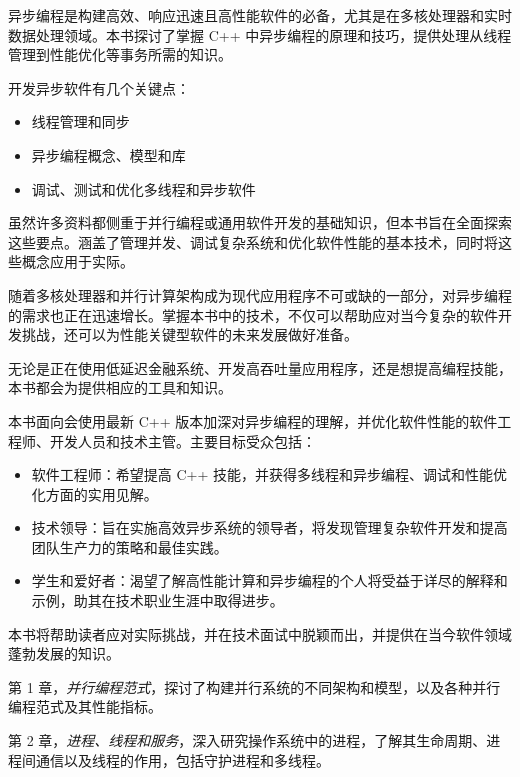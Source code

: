 

异步编程是构建高效、响应迅速且高性能软件的必备，尤其是在多核处理器和实时数据处理领域。本书探讨了掌握 C++ 中异步编程的原理和技巧，提供处理从线程管理到性能优化等事务所需的知识。

开发异步软件有几个关键点：

\begin{itemize}
\item
线程管理和同步

\item
异步编程概念、模型和库

\item
调试、测试和优化多线程和异步软件
\end{itemize}

虽然许多资料都侧重于并行编程或通用软件开发的基础知识，但本书旨在全面探索这些要点。涵盖了管理并发、调试复杂系统和优化软件性能的基本技术，同时将这些概念应用于实际。

随着多核处理器和并行计算架构成为现代应用程序不可或缺的一部分，对异步编程的需求也正在迅速增长。掌握本书中的技术，不仅可以帮助应对当今复杂的软件开发挑战，还可以为性能关键型软件的未来发展做好准备。

无论是正在使用低延迟金融系统、开发高吞吐量应用程序，还是想提高编程技能，本书都会为提供相应的工具和知识。


本书面向会使用最新 C++ 版本加深对异步编程的理解，并优化软件性能的软件工程师、开发人员和技术主管。主要目标受众包括：

\begin{itemize}
\item
软件工程师：希望提高 C++ 技能，并获得多线程和异步编程、调试和性能优化方面的实用见解。

\item
技术领导：旨在实施高效异步系统的领导者，将发现管理复杂软件开发和提高团队生产力的策略和最佳实践。

\item
学生和爱好者：渴望了解高性能计算和异步编程的个人将受益于详尽的解释和示例，助其在技术职业生涯中取得进步。
\end{itemize}

本书将帮助读者应对实际挑战，并在技术面试中脱颖而出，并提供在当今软件领域蓬勃发展的知识。


第 1 章，\textit{并行编程范式}，探讨了构建并行系统的不同架构和模型，以及各种并行编程范式及其性能指标。

第 2 章，\textit{进程、线程和服务}，深入研究操作系统中的进程，了解其生命周期、进程间通信以及线程的作用，包括守护进程和多线程。


